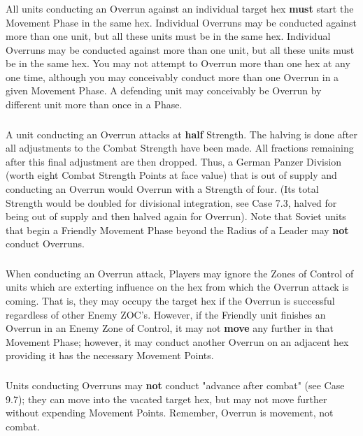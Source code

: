 \subsubsection{} All units conducting an Overrun against an individual target hex \textbf{must} start the Movement Phase in the same hex. Individual Overruns may be conducted against more than one unit, but all these units must be in the same hex. Individual Overruns may be conducted against more than one unit, but all these units must be in the same hex. You may not attempt to Overrun more than one hex at any one time, although you may conceivably conduct more than one Overrun in a given Movement Phase. A defending unit may conceivably be Overrun by different unit more than once in a Phase.

\subsubsection{} A unit conducting an Overrun attacks at \textbf{half} Strength. The halving is done after all adjustments to the Combat Strength have been made. All fractions remaining after this final adjustment are then dropped. Thus, a German Panzer Division (worth eight Combat Strength Points at face value) that is out of supply and conducting an Overrun would Overrun with a Strength of four. (Its total Strength would be doubled for divisional integration, see Case 7.3, halved for being out of supply and then halved again for Overrun). Note that Soviet units that begin a Friendly Movement Phase beyond the Radius of a Leader may \textbf{not} conduct Overruns.

\subsubsection{} When conducting an Overrun attack, Players may ignore the Zones of Control of units which are exterting influence on the hex from which the Overrun attack is coming. That is, they may occupy the target hex if the Overrun is successful regardless of other Enemy ZOC's. However, if the Friendly unit finishes an Overrun in an Enemy Zone of Control, it may not \textbf{move} any further in that Movement Phase; however, it may conduct another Overrun on an adjacent hex providing it has the necessary Movement Points.

\subsubsection{} Units conducting Overruns may \textbf{not} conduct "advance after combat" (see Case 9.7); they can move into the vacated target hex, but may not move further without expending Movement Points. Remember, Overrun is movement, not combat.

